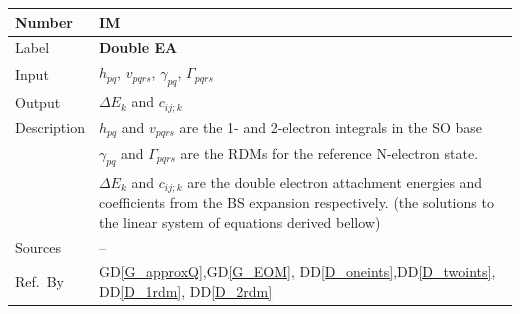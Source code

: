 \documentclass[12pt]{article}
\newcommand{\colAwidth}{0.13\textwidth}
\newcommand{\colBwidth}{0.82\textwidth}
\newcommand{\dref}[1]{GD\ref{#1}}
\newcommand{\ddref}[1]{DD\ref{#1}}
\newcounter{instnum} %
\begin{document}

\noindent
\begin{minipage}{\textwidth}
	\renewcommand*{\arraystretch}{1.5}
	\begin{tabular}{| p{\colAwidth} | p{\colBwidth}|}
		\hline
		\rowcolor[gray]{0.9}
		Number& IM{instnum}\theinstnum \label{IM_DEA}\\
		\hline
		Label& \bf Double EA\\
		\hline
		Input&$h_{pq}$, $v_{pqrs}$, $\gamma_{pq}$, $\Gamma_{pqrs}$ \\
		\hline
		Output&$\Delta E_k$ and $c_{ij;k}$\\
		\hline
		Description& $h_{pq} $ and $ v_{pqrs}$ are the 1- and 2-electron 
		integrals in the SO base\\
		& $\gamma_{pq}$ and $\Gamma_{pqrs}$ are the RDMs for the reference 
		N-electron state.\\
		&$\Delta E_k$ and $c_{ij;k}$ are the double electron attachment 
		energies and coefficients from the BS expansion respectively. (the 
		solutions to the linear 
		system of equations derived bellow)\\
		\hline
		Sources& -- \\
		\hline
		Ref.\ By & \dref{G_approxQ},\dref{G_EOM},  
		\ddref{D_oneints},\ddref{D_twoints}, \ddref{D_1rdm}, 
		\ddref{D_2rdm}\\
		\hline
	\end{tabular}
\end{minipage}\\

~\newline
\end{document}
